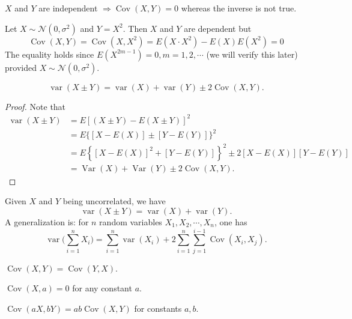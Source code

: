 \documentclass[11pt,singlecolumn, openany, citestyle=authoryear]{elegantbook}
\begin{document}
\begin{CJK}{UTF8}{gbsn}
\begin{property}
    $X$ and $Y$ are independent $\Longrightarrow \operatorname{Cov}(X,Y)=0$ whereas 
    the inverse is not true.
\end{property}
\begin{example}
    Let $X\sim \mathcal{N}(0,\sigma^2)$ and $Y=X^2$. Then $X$ and $Y$ are dependent but 
    $$
    \operatorname{Cov}(X,Y)=\operatorname{Cov}(X,X^2)=E(X\cdot X^2)-E(X)E(X^2)=0
    $$
    The equality holds since $E(X^{2m-1})=0, m = 1,2,\cdots$ (we will verify this later)
    provided $X\sim \mathcal{N}(0,\sigma^2)$.
\end{example}
\begin{property}
    \begin{equation}
        \operatorname{var}(X\pm Y)=\operatorname{var}(X)+\operatorname{var}(Y)\pm 
        2\operatorname{Cov}(X,Y).
    \end{equation}
\end{property}
\begin{proof}
    Note that 
    \begin{align*}
        \operatorname{var}(X \pm Y) & =E[(X \pm Y)-E(X \pm Y)]^2 \\
        & =E\{[X-E(X)] \pm[Y-E(Y)]\}^2 \\
        & =E\left\{[X-E(X)]^2+[Y-E(Y)]\right\}^2 \pm 2[X-E(X)][Y-E(Y)] \\
        & =\operatorname{Var}(X)+\operatorname{Var}(Y) \pm 2 \operatorname{Cov}(X, Y) .
    \end{align*}
\end{proof}
\begin{note}
    Given $X$ and $Y$ being uncorrelated, we have 
    $$
    \operatorname{var}(X\pm Y)=\operatorname{var}(X)+\operatorname{var}(Y).
    $$
    A generalization is: for $n$ random variables $X_1,X_2,\cdots,X_n$, one has
    \begin{equation}
        \operatorname{var}\bigg(\sum_{i=1}^n X_i\bigg)=
        \sum_{i=1}^n \operatorname{var}(X_i)+2\sum_{i=1}^n \sum_{j=1}^{i-1}
        \operatorname{Cov}(X_i,X_j).
    \end{equation} 
\end{note}
\begin{property}
    $\operatorname{Cov}(X,Y)=\operatorname{Cov}(Y,X)$.
\end{property}
\begin{property}
    $\operatorname{Cov}(X,a)=0$ for any constant $a$.
\end{property}
\begin{property}
    $\operatorname{Cov}(aX,bY)=ab\operatorname{Cov}(X,Y)$ for constants $a,b$.

\end{property}
\end{CJK}
\end{document}
